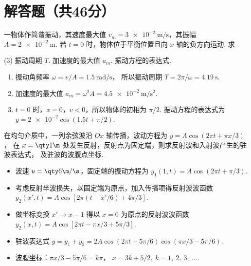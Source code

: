 \section{解答题（共46分）}

\begin{problem}[本题12分]
  一物体作简谐振动，其速度最大值 $v_m = \qty{3e-2}{\m/\s}$，其振幅 $A = \qty{2e-2}\m$.
  若 $t = 0$ 时，物体位于平衡位置且向 $x$ 轴的负方向运动. 求
  \begin{tasks}[ label = \arabic*. ](3)
    \task 振动周期 $T$.
    \task 加速度的最大值 $a_m$.
    \task 振动方程的表达式.
  \end{tasks}
\end{problem}
\scratch[10ex]
\begin{solution}\leavevmode
  \begin{enumerate}
    \item 振动角频率 $\omega = v/A = \qty{1.5}{\radian/\s}$，
    所以振动周期 $T = 2\pi/\omega = \qty{4.19}\s$.
    \item 加速度的最大值 $a_m = \omega^2A =\qty{4.5e-2}{\m/\s^2}$.
    \item $t = 0$ 时，$x = 0$，$v < 0$，所以物体的初相为 $\pi/2$.
    振动方程的表达式为 $y = \num{2e-2}\cos(1.5 t + \pi/2)$.
  \end{enumerate}
\end{solution}

\begin{problem}[本题12分]
  在均匀介质中，一列余弦波沿 $Ox$ 轴传播，波动方程为 $y = A\cos(2\pi t + \pi x/3)$，
  在 $x = \qty1\m$ 处发生反射，反射点为固定端，则求反射波和入射波产生的驻波表达式，
  及驻波的波腹点坐标.
\end{problem}
\scratch[20ex]
\begin{solution}\leavevmode
  \begin{itemize}
    \item 波速 $u = \qty6{\m/\s}$，固定端的振动方程为
    $y_1(1,t) = A\cos(2\pi t + \pi/3)$.
    \item 考虑反射半波损失，以固定端为原点，加入传播项得反射波波函数
    $y_2(x',t) = A\cos[2\pi(t - x'/6) + 4\pi/3]$.
    \item 做坐标变换 $x' \to x - 1$ 得以 $x = 0$ 为原点的反射波波函数
    $y_2(x,t) = A\cos[2\pi t - \pi x/3 + 5\pi/3]$.
    \item 驻波表达式
    $y = y_1 + y_2 = 2A\cos(2\pi t + 5\pi/6)\cos(\pi x/3 - 5\pi/6)$.
    \item 波腹坐标：$\pi x/3 - 5\pi/6 = k\pi$，
    $x = 3k + 5/2,~ k = 1,~ 2,~ 3,~ \ldots$.
  \end{itemize}
\end{solution}

